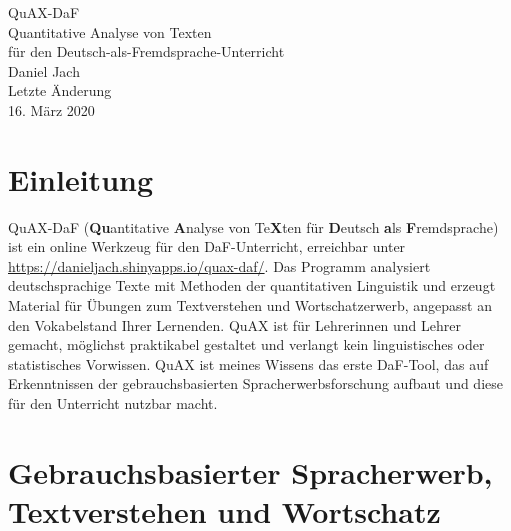 \documentclass[11pt]{article}\usepackage[]{graphicx}\usepackage[]{color}
\begin{document}










\thispagestyle{empty}


  \begin{titlepage}
    \vspace*{\fill}
    \begin{center}
      {\Huge QuAX-DaF}\\[0.5cm]
      {\Large Quantitative Analyse von Texten\\für den Deutsch-als-Fremdsprache-Unterricht}\\[2cm]
      {\Large Daniel Jach}\\[2cm]
      Letzte Änderung\\16. März 2020\\[2cm]
    \end{center}
    \vspace*{\fill}
  \end{titlepage}






\newpage

\section{Einleitung}

QuAX-DaF (\textbf{Qu}antitative \textbf{A}nalyse von Te\textbf{X}ten für \textbf{D}eutsch \textbf{a}ls \textbf{F}remdsprache) ist ein online Werkzeug für den DaF-Unterricht, erreichbar unter \href{https://danieljach.shinyapps.io/quax-daf/}{https://danieljach.shinyapps.io/quax-daf/}. Das Programm analysiert deutschsprachige Texte mit Methoden der quantitativen Linguistik und erzeugt Material für Übungen zum Textverstehen und Wortschatzerwerb, angepasst an den Vokabelstand Ihrer Lernenden. QuAX ist für Lehrerinnen und Lehrer gemacht, möglichst praktikabel gestaltet und verlangt kein linguistisches oder statistisches Vorwissen. QuAX ist meines Wissens das erste DaF-Tool, das auf Erkenntnissen der gebrauchsbasierten Spracherwerbsforschung aufbaut und diese für den Unterricht nutzbar macht. 

\section{Gebrauchsbasierter Spracherwerb, Textverstehen und Wortschatz}
\end{document}
